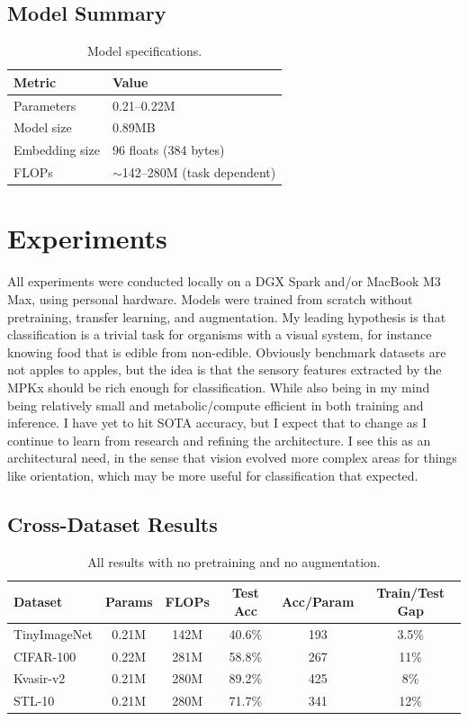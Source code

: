 \documentclass{article}
\begin{document}
\subsection{Model Summary}

\begin{table}[h]
\centering
\begin{tabular}{ll}
\toprule
\textbf{Metric} & \textbf{Value} \\
\midrule
Parameters & 0.21--0.22M \\
Model size & 0.89MB \\
Embedding size & 96 floats (384 bytes) \\
FLOPs & $\sim$142--280M (task dependent) \\
\bottomrule
\end{tabular}
\caption{Model specifications.}
\label{tab:model-summary}
\end{table}

\section{Experiments}

All experiments were conducted locally on a DGX Spark and/or MacBook M3 Max, using personal hardware. Models were trained from scratch without pretraining, transfer learning, and augmentation. My leading hypothesis is that classification is a trivial task for organisms with a visual system, for instance knowing food that is edible from non-edible. Obviously benchmark datasets are not apples to apples, but the idea is that the sensory features extracted by the MPKx should be rich enough for classification. While also being in my mind being relatively small and metabolic/compute efficient in both training and inference. I have yet to hit SOTA accuracy, but I expect that to change as I continue to learn from research and refining the architecture. I see this as an architectural need, in the sense that vision evolved more complex areas for things like orientation, which may be more useful for classification that expected.

\subsection{Cross-Dataset Results}

\begin{table}[h]
\centering
\begin{tabular}{lccccc}
\toprule
\textbf{Dataset} & \textbf{Params} & \textbf{FLOPs} & \textbf{Test Acc} & \textbf{Acc/Param} & \textbf{Train/Test Gap} \\
\midrule
TinyImageNet & 0.21M & 142M & 40.6\% & 193 & 3.5\% \\
CIFAR-100 & 0.22M & 281M & 58.8\% & 267 & 11\% \\
Kvasir-v2 & 0.21M & 280M & 89.2\% & 425 & 8\% \\
STL-10 & 0.21M & 280M & 71.7\% & 341 & 12\% \\
\bottomrule
\end{tabular}
\caption{All results with no pretraining and no augmentation.}
\label{tab:cross-dataset}
\end{table}
\end{document}
